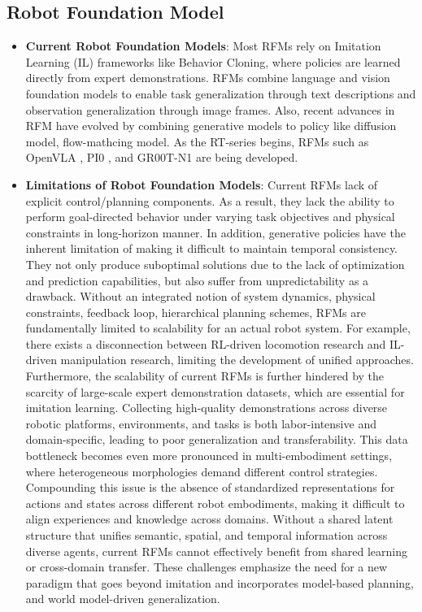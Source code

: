 \documentclass[11pt]{article}
\begin{document}
\subsection{Robot Foundation Model}
\begin{itemize}
    \item \textbf{Current Robot Foundation Models}: Most RFMs rely on Imitation Learning (IL) frameworks like Behavior Cloning, where policies are learned directly from expert demonstrations. RFMs combine language and vision foundation models to enable task generalization through text descriptions and observation generalization through image frames. Also, recent advances in RFM have evolved by combining generative models to policy like diffusion model, flow-mathcing model. As the RT-series \cite{rt1,rt2} begins, RFMs such as OpenVLA \cite{openvla}, PI0 \cite{pi0}, and GR00T-N1 \cite{gr00t} are being developed.

    
    \item \textbf{Limitations of Robot Foundation Models}: Current RFMs lack of explicit control/planning components. As a result, they lack the ability to perform goal-directed behavior under varying task objectives and physical constraints in long-horizon manner. In addition, generative policies have the inherent limitation of making it difficult to maintain temporal consistency. They not only produce suboptimal solutions due to the lack of optimization and prediction capabilities, but also suffer from unpredictability as a drawback. Without an integrated notion of system dynamics, physical constraints, feedback loop, hierarchical planning schemes, RFMs are fundamentally limited to scalability for an actual robot system.
For example, there exists a disconnection between RL-driven locomotion research and IL-driven manipulation research, limiting the development of unified approaches.
Furthermore, the scalability of current RFMs is further hindered by the scarcity of large-scale expert demonstration datasets, which are essential for imitation learning. Collecting high-quality demonstrations across diverse robotic platforms, environments, and tasks is both labor-intensive and domain-specific, leading to poor generalization and transferability. This data bottleneck becomes even more pronounced in multi-embodiment settings, where heterogeneous morphologies demand different control strategies. Compounding this issue is the absence of standardized representations for actions and states across different robot embodiments, making it difficult to align experiences and knowledge across domains. Without a shared latent structure that unifies semantic, spatial, and temporal information across diverse agents, current RFMs cannot effectively benefit from shared learning or cross-domain transfer. 
These challenges emphasize the need for a new paradigm that goes beyond imitation and incorporates model-based planning, and world model-driven generalization.

\end{itemize}
\end{document}
